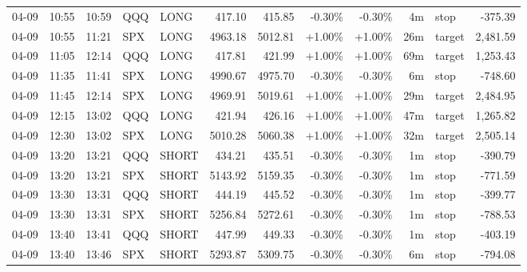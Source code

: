 \documentclass[11pt,a4paper,twoside]{article}
\begin{document}
\begin{center}
\begin{longtable}{>{\color{txtmain}}l l l l l r r r r r >{\color{txtmain}}l r}
04-09 & 10:55 & 10:59 & QQQ & LONG & 417.10 & 415.85 & \textcolor{lossred}{-0.30\%} & \textcolor{lossred}{-0.30\%} & 4m & stop & \textcolor{lossred}{-375.39} \\
04-09 & 10:55 & 11:21 & SPX & LONG & 4963.18 & 5012.81 & \textcolor{wingreen}{+1.00\%} & \textcolor{wingreen}{+1.00\%} & 26m & target & \textcolor{wingreen}{2,481.59} \\
04-09 & 11:05 & 12:14 & QQQ & LONG & 417.81 & 421.99 & \textcolor{wingreen}{+1.00\%} & \textcolor{wingreen}{+1.00\%} & 69m & target & \textcolor{wingreen}{1,253.43} \\
04-09 & 11:35 & 11:41 & SPX & LONG & 4990.67 & 4975.70 & \textcolor{lossred}{-0.30\%} & \textcolor{lossred}{-0.30\%} & 6m & stop & \textcolor{lossred}{-748.60} \\
04-09 & 11:45 & 12:14 & SPX & LONG & 4969.91 & 5019.61 & \textcolor{wingreen}{+1.00\%} & \textcolor{wingreen}{+1.00\%} & 29m & target & \textcolor{wingreen}{2,484.95} \\
04-09 & 12:15 & 13:02 & QQQ & LONG & 421.94 & 426.16 & \textcolor{wingreen}{+1.00\%} & \textcolor{wingreen}{+1.00\%} & 47m & target & \textcolor{wingreen}{1,265.82} \\
04-09 & 12:30 & 13:02 & SPX & LONG & 5010.28 & 5060.38 & \textcolor{wingreen}{+1.00\%} & \textcolor{wingreen}{+1.00\%} & 32m & target & \textcolor{wingreen}{2,505.14} \\
04-09 & 13:20 & 13:21 & QQQ & SHORT & 434.21 & 435.51 & \textcolor{lossred}{-0.30\%} & \textcolor{lossred}{-0.30\%} & 1m & stop & \textcolor{lossred}{-390.79} \\
04-09 & 13:20 & 13:21 & SPX & SHORT & 5143.92 & 5159.35 & \textcolor{lossred}{-0.30\%} & \textcolor{lossred}{-0.30\%} & 1m & stop & \textcolor{lossred}{-771.59} \\
04-09 & 13:30 & 13:31 & QQQ & SHORT & 444.19 & 445.52 & \textcolor{lossred}{-0.30\%} & \textcolor{lossred}{-0.30\%} & 1m & stop & \textcolor{lossred}{-399.77} \\
04-09 & 13:30 & 13:31 & SPX & SHORT & 5256.84 & 5272.61 & \textcolor{lossred}{-0.30\%} & \textcolor{lossred}{-0.30\%} & 1m & stop & \textcolor{lossred}{-788.53} \\
04-09 & 13:40 & 13:41 & QQQ & SHORT & 447.99 & 449.33 & \textcolor{lossred}{-0.30\%} & \textcolor{lossred}{-0.30\%} & 1m & stop & \textcolor{lossred}{-403.19} \\
04-09 & 13:40 & 13:46 & SPX & SHORT & 5293.87 & 5309.75 & \textcolor{lossred}{-0.30\%} & \textcolor{lossred}{-0.30\%} & 6m & stop & \textcolor{lossred}{-794.08} \\

\end{longtable}
\end{center}
\end{document}
